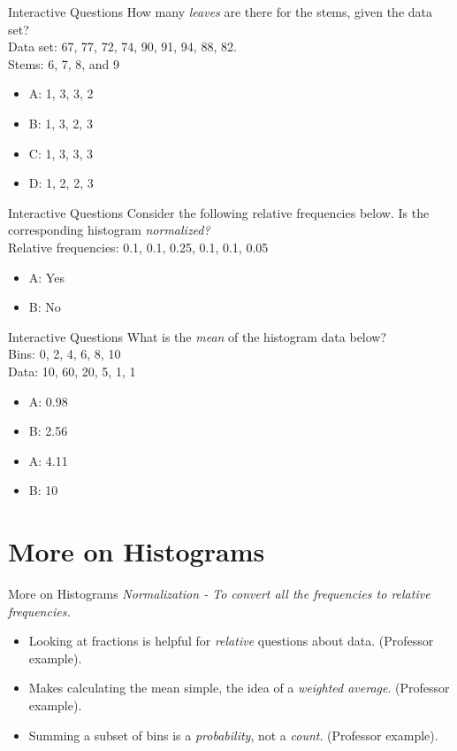 \documentclass{beamer}
\begin{document}
\begin{frame}{Interactive Questions}
How many \textit{leaves} are there for the stems, given the data set? \\
Data set: 67, 77, 72, 74, 90, 91, 94, 88, 82. \\
Stems: 6, 7, 8, and 9
\begin{itemize}
\item A: 1, 3, 3, 2
\item B: 1, 3, 2, 3
\item C: 1, 3, 3, 3
\item D: 1, 2, 2, 3
\end{itemize}
\end{frame}

\begin{frame}{Interactive Questions}
Consider the following relative frequencies below.  Is the corresponding histogram \textit{normalized?}\\
Relative frequencies: 0.1, 0.1, 0.25, 0.1, 0.1, 0.05
\begin{itemize}
\item A: Yes
\item B: No
\end{itemize}
\end{frame}

\begin{frame}{Interactive Questions}
What is the \textit{mean} of the histogram data below? \\
Bins: 0, 2, 4, 6, 8, 10 \\
Data: 10, 60, 20, 5, 1, 1
\begin{itemize}
\item A: 0.98
\item B: 2.56
\item A: 4.11
\item B: 10
\end{itemize}
\end{frame}

\section{More on Histograms}

\begin{frame}{More on Histograms}
\textit{\alert{Normalization} - To convert all the frequencies to relative frequencies.}
\begin{itemize}
\item Looking at fractions is helpful for \textit{relative} questions about data. (Professor example).
\item Makes calculating the mean simple, the idea of a \textit{weighted average}. (Professor example).
\item Summing a subset of bins is a \textit{probability}, not a \textit{count}. (Professor example).
\end{itemize}
\end{frame}
\end{document}

